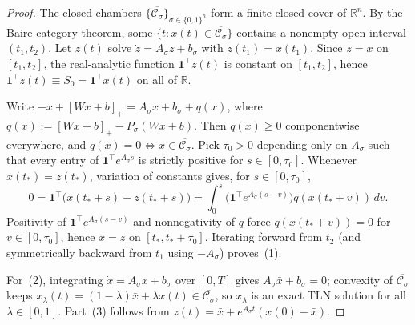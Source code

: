 \documentclass[11pt]{article}
\theoremstyle{plain}
\theoremstyle{definition}
\theoremstyle{remark}
\begin{document}
\begin{proof}
The closed chambers $\{\overline{\mathcal{C}_\sigma}\}_{\sigma \in \{0,1\}^n}$ form a finite closed cover of $\mathbb{R}^n$. By the Baire category theorem, some $\{t : x(t) \in \overline{\mathcal{C}_\sigma}\}$ contains a nonempty open interval $(t_1, t_2)$. Let $z(t)$ solve $\dot{z} = A_\sigma z + b_\sigma$ with $z(t_1) = x(t_1)$. Since $z = x$ on $[t_1, t_2]$, the real-analytic function $\mathbf{1}^\top z(t)$ is constant on $[t_1, t_2]$, hence $\mathbf{1}^\top z(t) \equiv S_0 = \mathbf{1}^\top x(t)$ on all of $\mathbb{R}$.

Write $-x + [Wx + b]_+ = A_\sigma x + b_\sigma + q(x)$, where $q(x) := [Wx + b]_+ - P_\sigma(Wx + b)$. Then $q(x) \ge 0$ componentwise everywhere, and $q(x) = 0 \iff x \in \overline{\mathcal{C}_\sigma}$. Pick $\tau_0 > 0$ depending only on $A_\sigma$ such that every entry of $\mathbf{1}^\top e^{A_\sigma s}$ is strictly positive for $s \in [0, \tau_0]$. Whenever $x(t_*) = z(t_*)$, variation of constants gives, for $s \in [0, \tau_0]$,
\[
0 = \mathbf{1}^\top\bigl(x(t_* + s) - z(t_* + s)\bigr) = \int_0^s \bigl(\mathbf{1}^\top e^{A_\sigma(s - v)}\bigr) q(x(t_* + v))\,dv.
\]
Positivity of $\mathbf{1}^\top e^{A_\sigma(s-v)}$ and nonnegativity of $q$ force $q(x(t_* + v)) = 0$ for $v \in [0, \tau_0]$, hence $x = z$ on $[t_*, t_* + \tau_0]$. Iterating forward from $t_2$ (and symmetrically backward from $t_1$ using $-A_\sigma$) proves~(1).

For~(2), integrating $\dot{x} = A_\sigma x + b_\sigma$ over $[0, T]$ gives $A_\sigma \bar{x} + b_\sigma = 0$; convexity of $\overline{\mathcal{C}_\sigma}$ keeps $x_\lambda(t) = (1-\lambda)\bar{x} + \lambda x(t) \in \overline{\mathcal{C}_\sigma}$, so $x_\lambda$ is an exact TLN solution for all $\lambda \in [0, 1]$. Part~(3) follows from $z(t) = \bar{x} + e^{A_\sigma t}(x(0) - \bar{x})$.
\end{proof}
\end{document}
